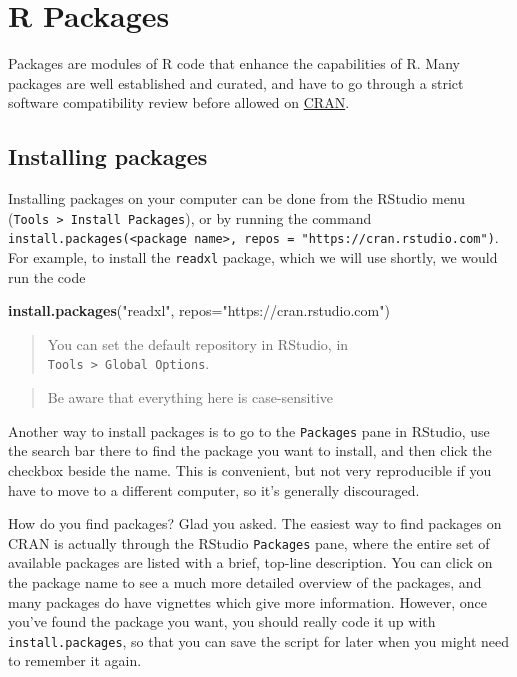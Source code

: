 \documentclass[12pt,letterpaperpaper,openany]{book}
\newenvironment{Shaded}{\begin{snugshade}}{\end{snugshade}}
\newcommand{\DataTypeTok}[1]{\textcolor[rgb]{0.13,0.29,0.53}{#1}}
\newcommand{\KeywordTok}[1]{\textcolor[rgb]{0.13,0.29,0.53}{\textbf{#1}}}
\newcommand{\NormalTok}[1]{#1}
\newcommand{\StringTok}[1]{\textcolor[rgb]{0.31,0.60,0.02}{#1}}
\begin{document}
\hypertarget{r-packages}{%
\section{R Packages}\label{r-packages}}

Packages are modules of R code that enhance the capabilities of R. Many packages are well established and curated, and have to go through a strict software compatibility review before allowed on \href{https://cran.rstudio.com}{CRAN}.

\hypertarget{installing-packages}{%
\subsection*{Installing packages}\label{installing-packages}}

Installing packages on your computer can be done from the RStudio menu (\texttt{Tools\ \textgreater{}\ Install\ Packages}),
or by running the command \texttt{install.packages(\textless{}package\ name\textgreater{},\ repos\ =\ "https://cran.rstudio.com")}. For example, to install the \texttt{readxl} package, which we will use shortly, we would run the code

\begin{Shaded}
\begin{Highlighting}[]
\KeywordTok{install.packages}\NormalTok{(}\StringTok{"readxl"}\NormalTok{, }\DataTypeTok{repos=}\StringTok{"https://cran.rstudio.com"}\NormalTok{)}
\end{Highlighting}
\end{Shaded}

\begin{quote}
You can set the default repository in RStudio, in \texttt{Tools\ \textgreater{}\ Global\ Options}.
\end{quote}

\begin{quote}
Be aware that everything here is case-sensitive
\end{quote}

Another way to install packages is to go to the \texttt{Packages} pane in RStudio, use the search bar there to
find the package you want to install, and then click the checkbox beside the name. This is convenient,
but not very reproducible if you have to move to a different computer, so it's generally discouraged.

How do you find packages? Glad you asked. The easiest way to find packages on CRAN is actually through the RStudio \texttt{Packages} pane, where the entire set of available packages are listed with a brief, top-line description. You can click on the package name to see a much more detailed overview of the packages, and many packages do have vignettes which give more information. However, once you've found the package you want, you should really code it up with \texttt{install.packages}, so that you can save the script for later when you might need to remember it again.
\end{document}
